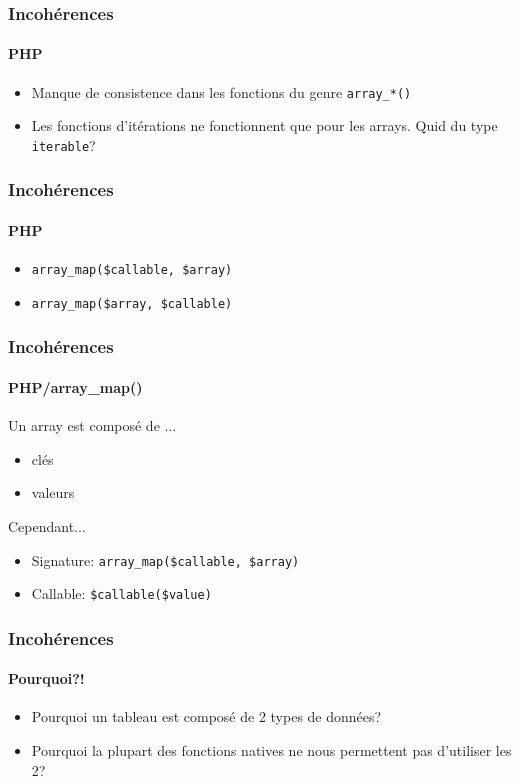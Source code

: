 \begin{frame}
	\frametitle{Incohérences}
    \framesubtitle{PHP}

    \begin{itemize}[<+->]
        \item Manque de consistence dans les fonctions du genre \texttt{array\_*()}
        \item Les fonctions d'itérations ne fonctionnent que pour les arrays. Quid du type \texttt{iterable}?
    \end{itemize}
\end{frame}

\begin{frame}
	\frametitle{Incohérences}
    \framesubtitle{PHP}

    \begin{itemize}[<+->]
        \item \texttt{array\_map(\$callable, \$array)}
        \item \texttt{array\_map(\$array, \$callable)}
    \end{itemize}
\end{frame}

\begin{frame}
	\frametitle{Incohérences}
    \framesubtitle{PHP/array\_map()}

    Un array est composé de ...

    \begin{itemize}[<+->]
        \item clés
        \item valeurs
    \end{itemize}

    \pause

    Cependant...

    \pause

    \begin{itemize}[<+->]
        \item Signature: \texttt{array\_map(\$callable, \$array)}
        \item Callable: \texttt{\$callable(\$value)}
    \end{itemize}
\end{frame}

\begin{frame}
	\frametitle{Incohérences}
    \framesubtitle{Pourquoi?!}

    \begin{itemize}[<+->]
        \item Pourquoi un tableau est composé de 2 types de données?
        \item Pourquoi la plupart des fonctions natives ne nous permettent pas d'utiliser les 2?
    \end{itemize}
\end{frame}

